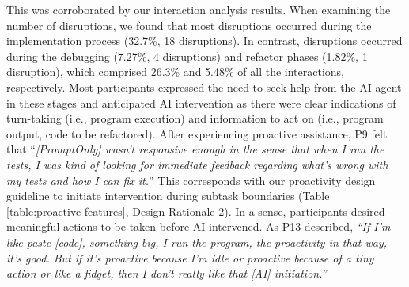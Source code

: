 This was corroborated by our interaction analysis results.
When examining the number of disruptions, we found that most disruptions occurred during the implementation process (32.7\%, 18 disruptions).
In contrast,  disruptions occurred during the debugging (7.27\%, 4 disruptions) and refactor phases (1.82\%, 1 disruption), which comprised 26.3\% and 5.48\% of all the interactions, respectively.
Most participants expressed the need to seek help from the AI agent in these stages and anticipated AI intervention as there were clear indications of turn-taking (i.e., program execution) and information to act on (i.e., program output, code to be refactored). 
After experiencing proactive assistance, P9 felt that ``\textit{[PromptOnly] wasn't responsive enough in the sense that when I ran the tests, I was kind of looking for immediate feedback regarding what's wrong with my tests and how I can fix it.}''
This corresponds with our proactivity design guideline to initiate intervention during subtask boundaries (Table \ref{table:proactive-features}, Design Rationale 2). 
In a sense, participants desired meaningful actions to be taken before AI intervened.
As P13 described, \textit{``If I'm like paste [code], something big, I run the program, the proactivity in that way, it's good. But if it's proactive because I'm idle or proactive because of a tiny action or like a fidget, then I don't really like that [AI] initiation.''}
